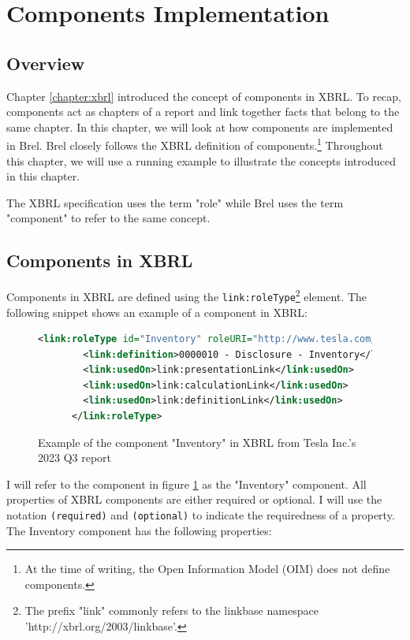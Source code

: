 \section{Components Implementation}

\subsection{Overview}

Chapter \ref{chapter:xbrl} introduced the concept of components in XBRL.
To recap, components act as chapters of a report and link together facts that belong to the same chapter.
In this chapter, we will look at how components are implemented in Brel.\cite{tesla_10q_2023_q3}
Brel closely follows the XBRL definition of components.\footnote{At the time of writing, the Open Information Model (OIM) does not define components.}
Throughout this chapter, we will use a running example to illustrate the concepts introduced in this chapter.

The XBRL specification uses the term "role" while Brel uses the term "component" to refer to the same concept. 

\subsection{Components in XBRL}

Components in XBRL are defined using the \texttt{link:roleType}\footnote{The prefix "link" commonly refers to the linkbase namespace 'http://xbrl.org/2003/linkbase'.} element. 
The following snippet shows an example of a component in XBRL:

\begin{figure}[H]
    \caption{Example of the component "Inventory" in XBRL from Tesla Inc.'s 2023 Q3 report\cite{tesla_10q_2023_q3}}
    \label{fig:example_component_xbrl}
    \begin{lstlisting}[language=XML,basicstyle=\fontsize{7}{10}\selectfont\ttfamily]
      <link:roleType id="Inventory" roleURI="http://www.tesla.com/role/Inventory">
        <link:definition>0000010 - Disclosure - Inventory</link:definition>
        <link:usedOn>link:presentationLink</link:usedOn>
        <link:usedOn>link:calculationLink</link:usedOn>
        <link:usedOn>link:definitionLink</link:usedOn>
      </link:roleType>
    \end{lstlisting}
\end{figure}

I will refer to the component in figure \ref{fig:example_component_xbrl} as the "Inventory" component.
All properties of XBRL components are either required or optional.
I will use the notation \texttt{(required)} and \texttt{(optional)} to indicate the requiredness of a property.
The Inventory component has the following properties:

